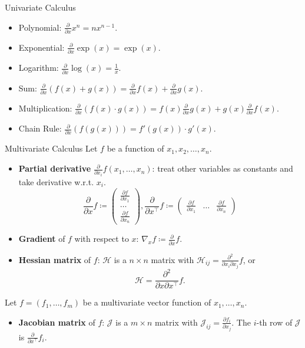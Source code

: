 \documentclass[10pt]{beamer}
\begin{document}
\begin{frame}{Univariate Calculus}
 \begin{itemize}
    \item Polynomial: $\frac{\partial}{\partial x} x^n = nx^{n-1}.$
    \item Exponential: $\frac{\partial}{\partial x} \exp(x) = \exp(x).$
    \item Logarithm: $\frac{\partial}{\partial x} \log(x) = \frac{1}{x}.$
    \item Sum: $\frac{\partial}{\partial x} (f(x)+g(x)) = \frac{\partial}{\partial x}f(x) + \frac{\partial}{\partial x} g(x).$
    \item Multiplication: $\frac{\partial}{\partial x} (f(x)\cdot g(x)) = f(x)\frac{\partial}{\partial x} g(x) + g(x)\frac{\partial}{\partial x}f(x).$
    \item Chain Rule: $\frac{\partial}{\partial x} (f(g(x))) = f'(g(x))\cdot g'(x).$
\end{itemize}   
\end{frame}

\begin{frame}{Multivariate Calculus}
Let $f$ be a function of $x_1, x_2, \dots, x_n$.
\begin{itemize}
    \item \textbf{Partial derivative} $\frac{\partial}{\partial x_i} f(x_1,\dots, x_n)$: treat other variables as constants and take derivative w.r.t. $x_i$.
    \[
        \frac{\partial}{\partial x}f \coloneqq \begin{pmatrix} 
\frac{\partial f}{\partial x_1}  \\
\dots \\
\frac{\partial f}{\partial x_n}  
\end{pmatrix},  \frac{\partial}{\partial x^\top}f \coloneqq \begin{pmatrix} 
\frac{\partial f}{\partial x_1}  &
\dots &
\frac{\partial f}{\partial x_n}  
\end{pmatrix}
    \]
    \item \textbf{Gradient} of $f$ with respect to $x$: $\nabla_x f \coloneqq \frac{\partial}{\partial x}f$.
    \item \textbf{Hessian matrix} of $f$: $\mathcal{H}$ is a $n\times n$ matrix with $\mathcal{H}_{ij} = \frac{\partial^2}{\partial x_i\partial x_j}f$, or 
    \[
        \mathcal{H} = \frac{\partial^2}{\partial x\partial x^\top}f.
    \]
\end{itemize}

Let $f = (f_1,\dots, f_m)$ be a multivariate vector function of $x_1, \dots, x_n$.
\begin{itemize}
    \item \textbf{Jacobian matrix} of $f$: $\mathcal{J}$ is a $m\times n$ matrix with $\mathcal{J}_{ij} = \frac{\partial f_i}{\partial x_j}$. The $i$-th row of $\mathcal{J}$ is $\frac{\partial }{\partial x^\top}f_i$.
\end{itemize}    
\end{frame}
\end{document}

